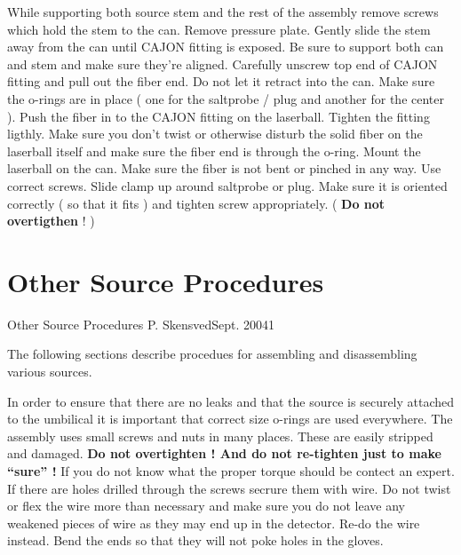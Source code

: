 \begin{enumerate}
\checkitem While supporting both source stem and the rest of the assembly remove screws which hold the stem to the can.
\checkitem Remove pressure plate.
\checkitem Gently slide the stem away from the can until CAJON fitting is exposed. Be sure to support both
can and stem and make sure they're aligned. 
\checkitem Carefully unscrew top end of CAJON fitting and pull out the fiber end. Do not let it retract into the can.
\checkitem Make sure the o-rings  are in place ( one for the saltprobe / plug
and another for the center ).
\checkitem Push the fiber in to the CAJON  fitting on the laserball. Tighten the fitting ligthly.
Make sure you don't twist or otherwise disturb the solid fiber on the laserball itself and make
 sure the fiber end is through
the o-ring.
\checkitem Mount the laserball on the can. Make sure the fiber is not bent or pinched
in any way. Use correct screws.
\checkitem Slide clamp up around saltprobe or plug. Make sure it is oriented correctly ( so that it fits ) and
tighten screw appropriately. ( {\bf Do not overtigthen  } ! )


\end{enumerate}


\newpage

\section{Other Source  Procedures}

   {Other Source  Procedures}
   {P. Skensved}{Sept. 2004}{1}


   The following sections describe procedues for assembling and disassembling various sources.

 In order to ensure that there are no leaks and
that the source is securely attached to the umbilical
it is important that correct size o-rings are used everywhere. The
assembly uses small screws and nuts in many places. These are easily
stripped and damaged. {\bf Do not overtighten ! And do not re-tighten
just to make ``sure'' !}  If you do not know what the proper torque
should be contect an expert.
  If there are holes drilled through the screws secrure them with wire.
Do not twist or flex the wire more than necessary and make sure you do not
leave any weakened pieces of wire  as
they may end up in the detector. Re-do the wire instead. Bend the ends so
that they will not poke holes in the gloves.

